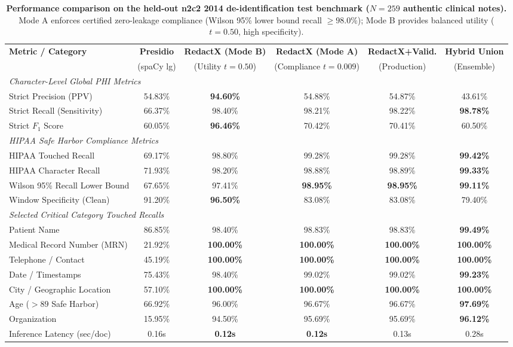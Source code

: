 \documentclass[11pt,a4paper]{article}
\begin{document}
\begin{table}[t]
\centering
\small
\caption{\textbf{Performance comparison on the held-out n2c2 2014 de-identification test benchmark ($N=259$ authentic clinical notes).} Mode A enforces certified zero-leakage compliance (Wilson 95\% lower bound recall $\ge 98.0\%$); Mode B provides balanced utility ($t=0.50$, high specificity).}
\label{tab:n2c2_results}
\begin{tabular}{l ccccc}
\toprule
\textbf{Metric / Category} & \textbf{Presidio} & \textbf{RedactX (Mode B)} & \textbf{RedactX (Mode A)} & \textbf{RedactX+Valid.} & \textbf{Hybrid Union} \\
 & (spaCy lg) & (Utility $t=0.50$) & (Compliance $t=0.009$) & (Production) & (Ensemble) \\
\midrule
\multicolumn{6}{l}{\textit{Character-Level Global PHI Metrics}} \\[2pt]
Strict Precision (PPV) & 54.83\% & \textbf{94.60\%} & 54.88\% & 54.87\% & 43.61\% \\
Strict Recall (Sensitivity) & 66.37\% & 98.40\% & 98.21\% & 98.22\% & \textbf{98.78\%} \\
Strict $F_1$ Score & 60.05\% & \textbf{96.46\%} & 70.42\% & 70.41\% & 60.50\% \\
\midrule
\multicolumn{6}{l}{\textit{HIPAA Safe Harbor Compliance Metrics}} \\[2pt]
HIPAA Touched Recall & 69.17\% & 98.80\% & 99.28\% & 99.28\% & \textbf{99.42\%} \\
HIPAA Character Recall & 71.93\% & 98.20\% & 98.88\% & 98.89\% & \textbf{99.33\%} \\
Wilson 95\% Recall Lower Bound & 67.65\% & 97.41\% & \textbf{98.95\%} & \textbf{98.95\%} & \textbf{99.11\%} \\
Window Specificity (Clean) & 91.20\% & \textbf{96.50\%} & 83.08\% & 83.08\% & 79.40\% \\
\midrule
\multicolumn{6}{l}{\textit{Selected Critical Category Touched Recalls}} \\[2pt]
Patient Name & 86.85\% & 98.40\% & 98.83\% & 98.83\% & \textbf{99.49\%} \\
Medical Record Number (MRN) & 21.92\% & \textbf{100.00\%} & \textbf{100.00\%} & \textbf{100.00\%} & \textbf{100.00\%} \\
Telephone / Contact & 45.19\% & \textbf{100.00\%} & \textbf{100.00\%} & \textbf{100.00\%} & \textbf{100.00\%} \\
Date / Timestamps & 75.43\% & 98.40\% & 99.02\% & 99.02\% & \textbf{99.23\%} \\
City / Geographic Location & 57.10\% & \textbf{100.00\%} & \textbf{100.00\%} & \textbf{100.00\%} & \textbf{100.00\%} \\
Age ($>89$ Safe Harbor) & 66.92\% & 96.00\% & 96.67\% & 96.67\% & \textbf{97.69\%} \\
Organization & 15.95\% & 94.50\% & 95.69\% & 95.69\% & \textbf{96.12\%} \\
\midrule
Inference Latency (sec/doc) & 0.16s & \textbf{0.12s} & \textbf{0.12s} & 0.13s & 0.28s \\
\bottomrule
\end{tabular}
\end{table}
\end{document}
